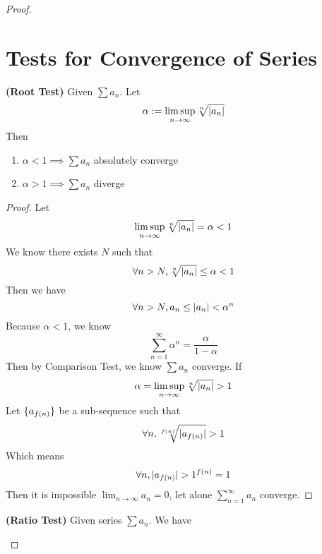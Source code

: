 \documentclass{report}
\begin{document}
\begin{proof}
\section{Tests for Convergence of Series}
\begin{theorem}
\label{4.5.1}
\textbf{(Root Test)} Given $\sum a_n$. Let
\begin{equation}
\alpha:= \limsup_{n\to\infty} \sqrt[n]{|a_n|} 
\end{equation}
Then 
\begin{enumerate}[label=(\alph*)]
  \item $\alpha <1\implies \sum a_n$ absolutely converge\\
  \item $\alpha >1\implies \sum a_n$ diverge
\end{enumerate}
\end{theorem}
\begin{proof}
Let 
\begin{equation}
\limsup_{n\to\infty} \sqrt[n]{|a_n|} =\alpha <1
\end{equation}
We know there exists $N$ such that
 \begin{equation}
\forall n>N, \sqrt[n]{|a_n|}\leq \alpha  <1 
\end{equation}
Then we have
\begin{equation}
\forall n>N, a_n\leq |a_n|<\alpha  ^n
\end{equation}
Because $\alpha <1$, we know 
\begin{equation}
\sum_{n=1}^\infty \alpha ^n=\frac{\alpha }{1-\alpha  }
\end{equation}
Then by Comparison Test, we know $\sum a_n$ converge. If
\begin{equation}
\alpha =\limsup_{n\to\infty} \sqrt[n]{|a_n|}>1
\end{equation}
Let $\{ a_{f(n)} \}$ be a sub-sequence such that
\begin{equation}
  \forall n,\sqrt[f(n)]{|a_{f(n)}|}>1 
\end{equation}
Which means
\begin{equation}
\forall n, \abso{a_{f(n)}}>1^{f(n)}=1
\end{equation}
Then it is impossible $\lim_{n\to\infty}a_n=0$, let alone $\sum_{n=1}^\infty a_n$ converge.
\end{proof}
\begin{theorem}
\label{4.5.2}
\textbf{(Ratio Test)} Given series $\sum a_n$. We have
\begin{enumerate}[label=(\alph*)]

\end{enumerate}
\end{theorem}
\end{proof}
\end{document}
